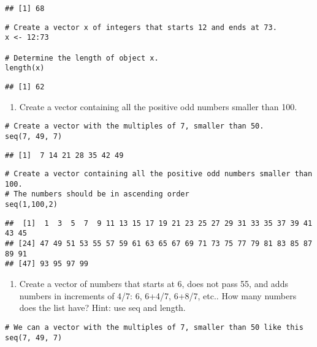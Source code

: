 \documentclass[
]{article}
\providecommand{\tightlist}{%
  \setlength{\itemsep}{0pt}\setlength{\parskip}{0pt}}
\begin{document}
\begin{verbatim}
## [1] 68
\end{verbatim}

\begin{verbatim}
# Create a vector x of integers that starts 12 and ends at 73.
x <- 12:73

# Determine the length of object x.
length(x)
\end{verbatim}

\begin{verbatim}
## [1] 62
\end{verbatim}

\begin{enumerate}
\def\labelenumi{\arabic{enumi}.}
\setcounter{enumi}{6}
\tightlist
\item
  Create a vector containing all the positive odd numbers smaller than
  100.
\end{enumerate}

\begin{verbatim}
# Create a vector with the multiples of 7, smaller than 50.
seq(7, 49, 7) 
\end{verbatim}

\begin{verbatim}
## [1]  7 14 21 28 35 42 49
\end{verbatim}

\begin{verbatim}
# Create a vector containing all the positive odd numbers smaller than 100.
# The numbers should be in ascending order
seq(1,100,2)
\end{verbatim}

\begin{verbatim}
##  [1]  1  3  5  7  9 11 13 15 17 19 21 23 25 27 29 31 33 35 37 39 41 43 45
## [24] 47 49 51 53 55 57 59 61 63 65 67 69 71 73 75 77 79 81 83 85 87 89 91
## [47] 93 95 97 99
\end{verbatim}

\begin{enumerate}
\def\labelenumi{\arabic{enumi}.}
\setcounter{enumi}{7}
\tightlist
\item
  Create a vector of numbers that starts at 6, does not pass 55, and
  adds numbers in increments of 4/7: 6, 6+4/7, 6+8/7, etc.. How many
  numbers does the list have? Hint: use seq and length.
\end{enumerate}

\begin{verbatim}
# We can a vector with the multiples of 7, smaller than 50 like this 
seq(7, 49, 7) 
\end{verbatim}
\end{document}

